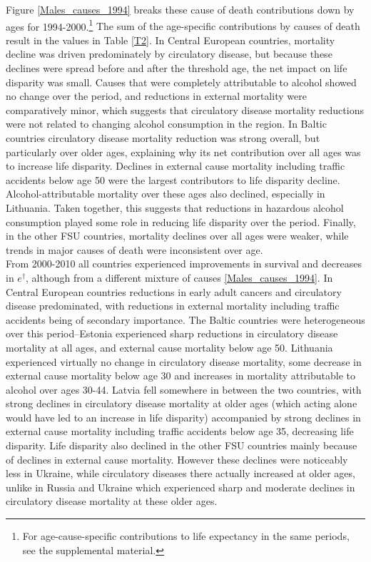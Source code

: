 \documentclass{article}
\begin{document}
\begin{spacing}{1.5}
\textcolor[rgb]{0,0.58,0}{Figure \ref{Males_causes_1994} breaks these cause of death contributions down by ages for 1994-2000.}\footnote{For age-cause-specific contributions to life expectancy in the same periods, see the supplemental material.} \textcolor[rgb]{0,0.58,0}{The sum of the age-specific contributions by causes of death result in the values in Table \ref{T2}. In Central European countries, mortality decline was driven predominately by circulatory disease, but because these declines were spread before and after the threshold age, the net impact on life disparity was small. Causes that were completely attributable to alcohol showed no change over the period, and reductions in external mortality were comparatively minor, which suggests that circulatory disease mortality reductions were not related to changing alcohol consumption in the region. In Baltic countries circulatory disease mortality reduction was strong overall, but particularly over older ages, explaining why its net contribution over all ages was to increase life disparity. Declines in external cause mortality including traffic accidents below age 50 were the largest contributors to life disparity decline. Alcohol-attributable mortality over these ages also declined, especially in Lithuania. Taken together, this suggests that reductions in hazardous alcohol consumption played some role in reducing life disparity over the period. Finally, in the other FSU countries, mortality declines over all ages were weaker, while trends in major causes of death were inconsistent over age. \\

From 2000-2010 all countries experienced improvements in survival and decreases in $e^\dagger$, although from a different mixture of causes \ref{Males_causes_1994}. In Central European countries reductions in early adult cancers and circulatory disease predominated, with reductions in external mortality including traffic accidents being of secondary importance. The Baltic countries were heterogeneous over this period--Estonia experienced sharp reductions in circulatory disease mortality at all ages, and external cause mortality below age 50. Lithuania experienced virtually no change in circulatory disease mortality, some decrease in external cause mortality below age 30 and increases in mortality attributable to alcohol over ages 30-44. Latvia fell somewhere in between the two countries, with strong declines in circulatory disease mortality at older ages (which acting alone would have led to an increase in life disparity) accompanied by strong declines in external cause mortality including traffic accidents below age 35, decreasing life disparity. Life disparity also declined in the other FSU countries mainly because of declines in external cause mortality. However these declines were noticeably less in Ukraine, while circulatory diseases there actually increased at older ages, unlike in Russia and Ukraine which experienced sharp and moderate declines in circulatory disease mortality at these older ages.}\\




\end{spacing}
\end{document}
